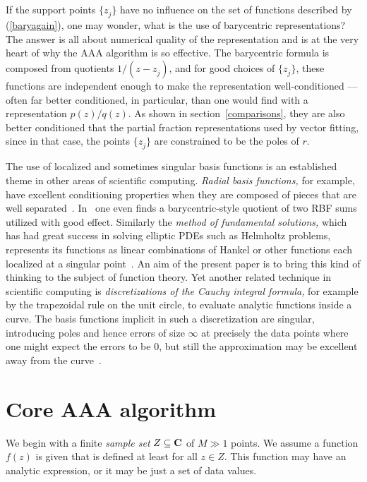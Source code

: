 \documentclass[final]{siamltex}
\def\C{{\bf C}}
\begin{document}
\smallskip

If the support points $\{z_j^{}\}$ have no influence on the set
of functions described by (\ref{baryagain}), one may wonder, what
is the use of barycentric representations?  The answer is all
about numerical quality of the representation and is at the very
heart of why the AAA algorithm is so effective.  The barycentric
formula is composed from quotients $1/(z-z_j^{})$, and for good
choices of $\{z_j^{}\}$, these functions are independent enough
to make the representation well-conditioned --- often far
better conditioned, in particular, than one would find with a
representation $p(z)/q(z)$.  As shown in
section~\ref{comparisons}, they are also better conditioned
that the partial fraction representations used by vector
fitting, since in that case, the points $\{z_j^{}\}$ are 
constrained to be the poles of $r$.

The use of localized and sometimes
singular basis functions is an established theme in other areas of
scientific computing.  {\em Radial basis functions,} for example,
have excellent conditioning properties when they are composed
of pieces that are well separated~\cite{ff}.  In~\cite{dfq}
one even finds a barycentric-style quotient of two RBF sums utilized
with good effect.  Similarly the {\em
method of fundamental solutions,} which has had great success in
solving elliptic PDEs such as Helmholtz problems, represents its
functions as linear combinations of Hankel or other functions
each localized at a singular point~\cite{bb}.  An aim of the
present paper is to bring this kind of thinking to the subject
of function theory.  Yet another related technique in scientific
computing is {\em discretizations of the Cauchy integral formula,}
for example by the trapezoidal rule on the unit circle, to evaluate
analytic functions inside a curve.  The basis functions implicit
in such a discretization are singular, introducing poles and hence
errors of size $\infty$ at precisely the data points where one
might expect the errors to be $0$, but still the approximation
may be excellent away from the curve~\cite{akt,qbx}.

\section{\label{core}Core AAA algorithm}
We begin with a finite {\em sample set\/} $Z \subseteq \C$ of
$M\gg 1$ points.  We assume a function $f(z)$ is given that is
defined at least for all $z\in Z$.  This function may have an analytic
expression, or it may be just a set of data values.
\end{document}
